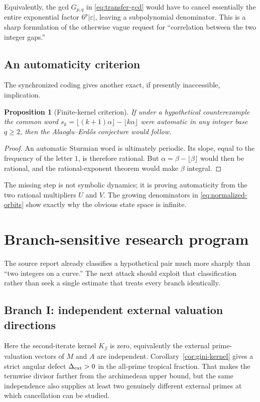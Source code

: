 \documentclass[11pt,oneside]{article}
\newtheorem{proposition}[theorem]{Proposition}
\theoremstyle{definition}
\theoremstyle{remark}
\begin{document}
Equivalently, the gcd $G_{p,q}$ in \eqref{eq:transfer-gcd} would have to cancel essentially the
entire exponential factor $6^p|\varepsilon|$, leaving a subpolynomial denominator.  This is a
sharp formulation of the otherwise vague request for ``correlation between the two integer
gaps.''

\subsection{An automaticity criterion}

The synchronized coding gives another exact, if presently inaccessible, implication.

\begin{proposition}[Finite-kernel criterion]\label{prop:automatic-criterion}
If under a hypothetical counterexample the common word
$s_k=\lfloor(k+1)\alpha\rfloor-\lfloor k\alpha\rfloor$ were automatic in any integer base
$q\ge2$, then the Alaoglu--Erd\H{o}s conjecture would follow.
\end{proposition}

\begin{proof}
An automatic Sturmian word is ultimately periodic.  Its slope, equal to the frequency of the
letter $1$, is therefore rational.  But $\alpha=\beta-\lfloor\beta\rfloor$ would then be
rational, and the rational-exponent theorem would make $\beta$ integral.
\end{proof}

The missing step is not symbolic dynamics; it is proving automaticity from the two rational
multipliers $U$ and $V$.  The growing denominators in \eqref{eq:normalized-orbits} show exactly why the
obvious state space is infinite.

\section{Branch-sensitive research program}
\label{ct:program}

The source report already classifies a hypothetical pair much more sharply than ``two
integers on a curve.''  The next attack should exploit that classification rather than seek a
single estimate that treats every branch identically.

\subsection{Branch I: independent external valuation directions}

Here the second-iterate kernel $K_\beta$ is zero, equivalently the external prime-valuation
vectors of $M$ and $A$ are independent.  Corollary~\ref{cor:gini-kernel} gives a strict
angular defect $\Delta_{\rm ext}>0$ in the all-prime tropical fraction.  That makes the
termwise divisor farther from the archimedean upper bound, but the same independence also
supplies at least two genuinely different external primes at which cancellation can be
studied.
\end{document}
